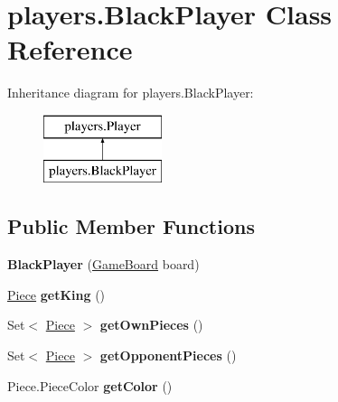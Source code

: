 \hypertarget{classplayers_1_1_black_player}{}\section{players.\+Black\+Player Class Reference}
\label{classplayers_1_1_black_player}
Inheritance diagram for players.\+Black\+Player\+:\begin{figure}[H]
\begin{center}
\leavevmode
\includegraphics[height=2.000000cm]{classplayers_1_1_black_player}
\end{center}
\end{figure}
\subsection*{Public Member Functions}
\begin{DoxyCompactItemize}
\item 
\mbox{\label{classplayers_1_1_black_player_a566125fc7169bdc81dca7ae5e84655b8}} 
{\bfseries Black\+Player} (\mbox{\hyperlink{classgameboard_1_1_game_board}{Game\+Board}} board)
\item 
\mbox{\label{classplayers_1_1_black_player_a6629df4da931d4a755313d398c87dc7b}} 
\mbox{\hyperlink{classpieces_1_1_piece}{Piece}} {\bfseries get\+King} ()
\item 
\mbox{\label{classplayers_1_1_black_player_acb52224c3f6bbcc9fb7f439f15c6129a}} 
Set$<$ \mbox{\hyperlink{classpieces_1_1_piece}{Piece}} $>$ {\bfseries get\+Own\+Pieces} ()
\item 
\mbox{\label{classplayers_1_1_black_player_ae40b8d5aad3b63fb0d3c37f8b7e39c08}} 
Set$<$ \mbox{\hyperlink{classpieces_1_1_piece}{Piece}} $>$ {\bfseries get\+Opponent\+Pieces} ()
\item 
\mbox{\label{classplayers_1_1_black_player_afc4f0852bbb72dc9e3e194cca26616d9}} 
Piece.\+Piece\+Color {\bfseries get\+Color} ()
\end{DoxyCompactItemize}
